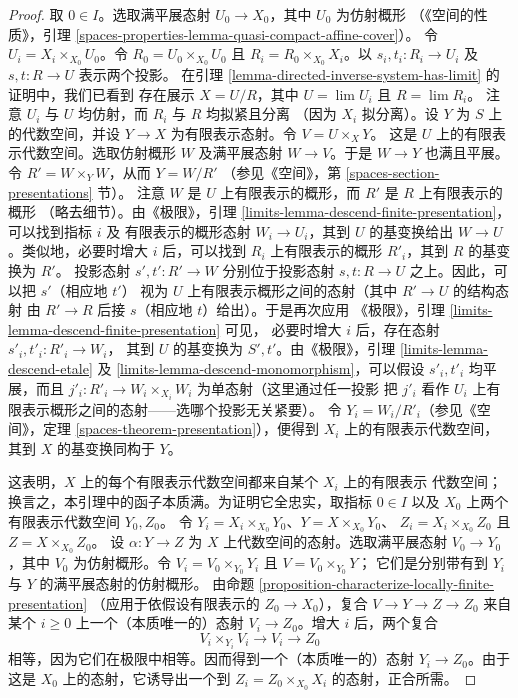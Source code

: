 \begin{proof}
取 $0 \in I$。选取满平展态射 $U_0 \to X_0$，其中 $U_0$ 为仿射概形
（《空间的性质》，引理
\ref{spaces-properties-lemma-quasi-compact-affine-cover}）。
令 $U_i = X_i \times_{X_0} U_0$。令
$R_0 = U_0 \times_{X_0} U_0$ 且
$R_i = R_0 \times_{X_0} X_i$。以
$s_i,t_i : R_i \to U_i$ 及 $s,t : R \to U$ 表示两个投影。
在引理 \ref{lemma-directed-inverse-system-has-limit} 的证明中，我们已看到
存在展示 $X = U/R$，其中 $U = \lim U_i$ 且 $R = \lim R_i$。
注意 $U_i$ 与 $U$ 均仿射，而 $R_i$ 与 $R$ 均拟紧且分离
（因为 $X_i$ 拟分离）。设 $Y$ 为 $S$ 上的代数空间，并设
$Y \to X$ 为有限表示态射。令 $V = U \times_X Y$。
这是 $U$ 上的有限表示代数空间。选取仿射概形 $W$ 及满平展态射
$W \to V$。于是 $W \to Y$ 也满且平展。令
$R' = W \times_Y W$，从而 $Y = W/R'$
（参见《空间》，第 \ref{spaces-section-presentations} 节）。
注意 $W$ 是 $U$ 上有限表示的概形，而 $R'$ 是 $R$ 上有限表示的概形
（略去细节）。由《极限》，引理
\ref{limits-lemma-descend-finite-presentation}，可以找到指标 $i$ 及
有限表示的概形态射 $W_i \to U_i$，其到 $U$ 的基变换给出
$W \to U$。类似地，必要时增大 $i$ 后，可以找到 $R_i$ 上有限表示的概形
$R'_i$，其到 $R$ 的基变换为 $R'$。
投影态射 $s',t' : R' \to W$ 分别位于投影态射
$s,t : R \to U$ 之上。因此，可以把 $s'$（相应地 $t'$）
视为 $U$ 上有限表示概形之间的态射（其中 $R' \to U$ 的结构态射
由 $R' \to R$ 后接 $s$（相应地 $t$）给出）。于是再次应用
《极限》，引理 \ref{limits-lemma-descend-finite-presentation} 可见，
必要时增大 $i$ 后，存在态射 $s'_i,t'_i : R'_i \to W_i$，
其到 $U$ 的基变换为 $S',t'$。由《极限》，引理
\ref{limits-lemma-descend-etale} 及
\ref{limits-lemma-descend-monomorphism}，可以假设
$s'_i,t'_i$ 均平展，而且
$j'_i : R'_i \to W_i \times_{X_i} W_i$ 为单态射（这里通过任一投影
把 $j'_i$ 看作 $U_i$ 上有限表示概形之间的态射——选哪个投影无关紧要）。
令 $Y_i = W_i/R'_i$（参见《空间》，定理
\ref{spaces-theorem-presentation}），便得到 $X_i$ 上的有限表示代数空间，
其到 $X$ 的基变换同构于 $Y$。

\medskip\noindent
这表明，$X$ 上的每个有限表示代数空间都来自某个 $X_i$ 上的有限表示
代数空间；换言之，本引理中的函子本质满。为证明它全忠实，取指标
$0 \in I$ 以及 $X_0$ 上两个有限表示代数空间 $Y_0,Z_0$。
令 $Y_i = X_i \times_{X_0} Y_0$、$Y = X \times_{X_0} Y_0$、
$Z_i = X_i \times_{X_0} Z_0$ 且 $Z = X \times_{X_0} Z_0$。
设 $\alpha : Y \to Z$ 为 $X$ 上代数空间的态射。选取满平展态射
$V_0 \to Y_0$，其中 $V_0$ 为仿射概形。令
$V_i = V_0 \times_{Y_0} Y_i$ 且 $V = V_0 \times_{Y_0} Y$；
它们是分别带有到 $Y_i$ 与 $Y$ 的满平展态射的仿射概形。
由命题 \ref{proposition-characterize-locally-finite-presentation}
（应用于依假设有限表示的 $Z_0 \to X_0$），复合
$V \to Y \to Z \to Z_0$ 来自某个 $i \geq 0$ 上一个（本质唯一的）态射
$V_i \to Z_0$。增大 $i$ 后，两个复合
$$
V_i \times_{Y_i} V_i \to V_i \to Z_0
$$
相等，因为它们在极限中相等。因而得到一个（本质唯一的）态射
$Y_i \to Z_0$。由于这是 $X_0$ 上的态射，它诱导出一个到
$Z_i = Z_0 \times_{X_0} X_i$ 的态射，正合所需。
\end{proof}

